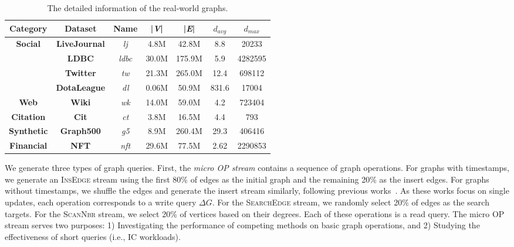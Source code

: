 \begin{table}[h]
\captionsetup{skip=0pt} 
\centering
\caption{The detailed information of the real-world graphs.}
\label{tab:datasets}
\begin{tabular}{|c|c|c|c|c|c|c|}
\hline
\textbf{Category}                & \textbf{Dataset}     & \textbf{Name} & \textbf{|\textit{V}|} & \textbf{|\textit{E}|} & \textit{\textbf{$d_{avg}$}} & $d_{max}$ \\ \hline
\multirow{4}{*}{\textbf{Social}} & \textbf{LiveJournal} & \emph{lj}       & 4.8M                  & 42.8M                 & 8.8                         & 20233     \\ \cline{2-7} 
                   & \textbf{LDBC}       & \emph{ldbc} & 30.0M  & 175.9M  & 5.9   & 4282595 \\ \cline{2-7} 
                   & \textbf{Twitter}    & \emph{tw}   & 21.3M & 265.0M & 12.4  & 698112 \\ \hline
\textbf{Game}      & \textbf{DotaLeague} & \emph{dl}   & 0.06M & 50.9M  & 831.6 & 17004   \\ \hline
\textbf{Web}       & \textbf{Wiki}       & \emph{wk}   & 14.0M & 59.0M  & 4.2   & 723404  \\ \hline
\textbf{Citation}  & \textbf{Cit}        & \emph{ct}   & 3.8M  & 16.5M  & 4.4   & 793     \\ \hline
\textbf{Synthetic} & \textbf{Graph500}   & \emph{g5}   & 8.9M  & 260.4M & 29.3  & 406416  \\ \hline
\textbf{Financial} & \textbf{NFT}   & \emph{nft}   & 29.6M  & 77.5M &  2.62 &  2290853 \\ \hline
\end{tabular}%
\end{table}

We generate three types of graph queries. First, the \emph{micro OP stream} contains a sequence of graph operations. For graphs with timestamps, we generate an \textsc{InsEdge} stream using the first 80\% of edges as the initial graph and the remaining 20\% as the insert edges. For graphs without timestamps, we shuffle the edges and generate the insert stream similarly, following previous works~\cite{zhu2019livegraph,de2021teseo,fuchs2022sortledton}. As these works focus on single updates, each operation corresponds to a write query $\Delta G$. For the \textsc{SearchEdge} stream, we randomly select 20\% of edges as the search targets. For the \textsc{ScanNbr} stream, we select 20\% of vertices based on their degrees. Each of these operations is a read query. The micro OP stream serves two purposes: 1) Investigating the performance of competing methods on basic graph operations, and 2) Studying the effectiveness of short queries (i.e., IC workloads).


